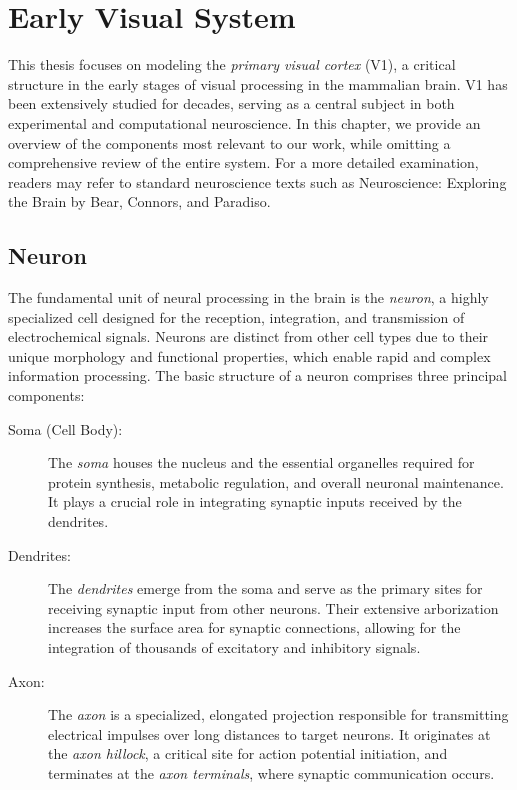 \chapter{Early Visual System}
\label{chap:visual_system}
This thesis focuses on modeling the \emph{primary visual cortex} (V1), a 
critical structure in the early stages of visual processing in the mammalian 
brain. V1 has been extensively studied for decades, serving as a central subject 
in both experimental and computational neuroscience. In this chapter, we 
provide an overview of the components most relevant to our work, while 
omitting a comprehensive review of the entire system. For a more detailed 
examination, readers may refer to standard neuroscience texts such as 
Neuroscience: Exploring the Brain by Bear, Connors, and Paradiso.

\section{Neuron}
\label{sec:neuron}
The fundamental unit of neural processing in the brain is the \emph{neuron}, a highly 
specialized cell designed for the reception, integration, and transmission of 
electrochemical signals. Neurons are distinct from other cell types due to their 
unique morphology and functional properties, which enable rapid and complex information 
processing. The basic structure of a neuron comprises three principal components:

\begin{description}
    \item[Soma (Cell Body):] The \emph{soma} houses the nucleus and the essential organelles required 
    for protein synthesis, metabolic regulation, and overall neuronal maintenance. It plays
    a crucial role in integrating synaptic inputs received by the dendrites.

    \item[Dendrites:] The \emph{dendrites} emerge from 
    the soma and serve as the primary sites for receiving synaptic input from other neurons. 
    Their extensive arborization increases the surface area for synaptic connections, allowing 
    for the integration of thousands of excitatory and inhibitory signals.

    \item[Axon:] The \emph{axon} is a specialized, elongated projection responsible for transmitting 
    electrical impulses over long distances to target neurons. It originates at the \emph{axon hillock},
    a critical site for action potential initiation, and terminates at the 
    \emph{axon terminals}, where synaptic communication occurs.
\end{description}

